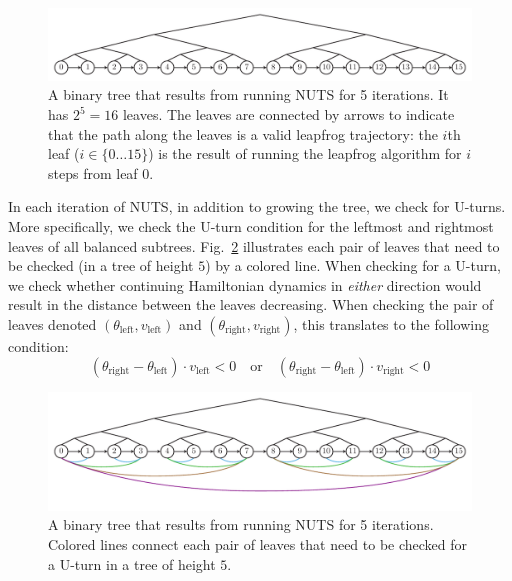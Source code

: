 \documentclass[12pt]{article}
\begin{document}
\begin{figure}[H]
\centering
\includegraphics[width=16cm]{illustrations/nuts_tree.pdf}
\caption{A binary tree that results from running NUTS for 5 iterations. It has $2^5 = 16$ leaves. The leaves are connected by arrows to indicate that the path along the leaves is a valid leapfrog trajectory: the $i$th leaf ($i \in \{0 \ldots 15\}$) is the result of running the leapfrog algorithm for $i$ steps from leaf $0$.}
\label{fig_nuts_tree}
\end{figure}

In each iteration of NUTS, in addition to growing the tree, we check for U-turns. More specifically, we check the U-turn condition for the leftmost and rightmost leaves of all balanced subtrees. Fig.\ \ref{fig_nuts_uturn_leaves} illustrates each pair of leaves that need to be checked (in a tree of height $5$) by a colored line. When checking for a U-turn, we check whether continuing Hamiltonian dynamics in \textit{either} direction would result in the distance between the leaves decreasing. When checking the pair of leaves denoted $(\theta_\text{left}, v_\text{left})$ and $(\theta_\text{right}, v_\text{right})$, this translates to the following condition:
\begin{equation}
(\theta_\text{right} - \theta_\text{left}) \cdot v_\text{left} < 0
\quad \text{or} \quad
(\theta_\text{right} - \theta_\text{left}) \cdot v_\text{right} < 0
\label{eq_uturn_both_dirs}
\end{equation}

\begin{figure}[H]
\centering
\includegraphics[width=16cm]{illustrations/nuts_uturn_leaves.pdf}
\caption{A binary tree that results from running NUTS for 5 iterations. Colored  lines connect each pair of leaves that need to be checked for a U-turn in a tree of height $5$.}
\label{fig_nuts_uturn_leaves}
\end{figure}
\end{document}
